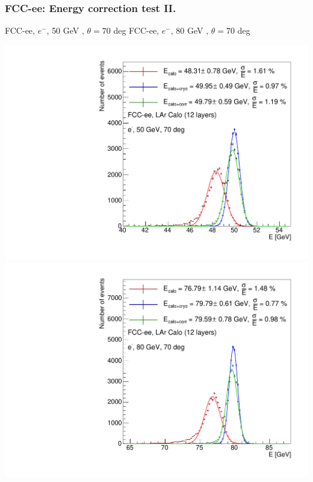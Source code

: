 \documentclass[aspectratio=169]{beamer}
\newcommand{\redtext}[1]{%
  \textcolor{myRed}{#1}
}
\begin{document}
\begin{frame}
  \frametitle{FCC-ee: Energy correction test II.}

  \centering
  FCC-ee, $e^{-}$, \redtext{50 GeV}, $\theta = 70$ deg \hspace{8mm}
  FCC-ee, $e^{-}$, \redtext{80 GeV}, $\theta = 70$ deg \\[1.5ex]
  \begin{adjustwidth}{-5mm}{-5mm}
    \includegraphics[width=0.49\linewidth]{figures/2d/hist_energy_corr_test_70deg_50GeV.pdf}
    \includegraphics[width=0.49\linewidth]{figures/2d/hist_energy_corr_test_70deg_80GeV.pdf}
  \end{adjustwidth}
\end{frame}
\end{document}
